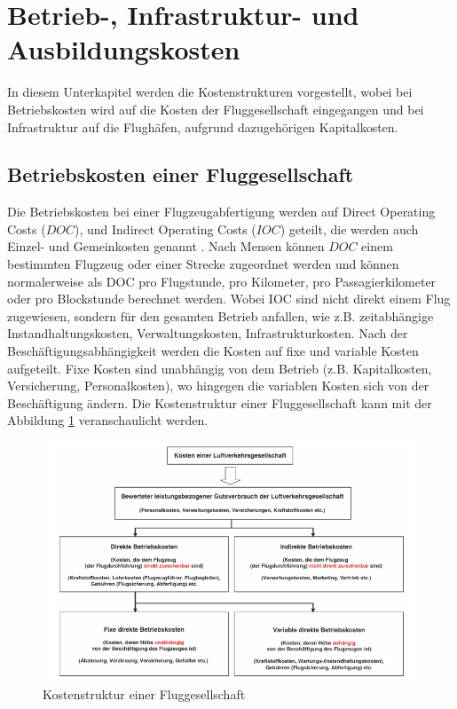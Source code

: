 \section{Betrieb-, Infrastruktur- und Ausbildungskosten}
\label{s:Kosten}
In diesem Unterkapitel werden die Kostenstrukturen vorgestellt, wobei bei Betriebskosten wird auf die Kosten der Fluggesellschaft
eingegangen und bei Infrastruktur auf die Flughäfen, aufgrund dazugehörigen Kapitalkosten.
%
\subsection{Betriebskosten einer Fluggesellschaft}

Die Betriebskosten bei einer Flugzeugabfertigung werden auf Direct Operating Costs ($DOC$), und Indirect Operating Costs 
($IOC$) geteilt, die werden auch Einzel- und Gemeinkosten genannt \cite{conrady2019luftverkehr}. 
Nach Mensen \cite{mensen2013handbuch} können $DOC$ einem bestimmten Flugzeug oder einer Strecke zugeordnet 
werden und können normalerweise als DOC pro Flugstunde, pro Kilometer, pro Passagierkilometer oder pro Blockstunde 
berechnet werden. Wobei IOC sind nicht direkt einem Flug zugewiesen, sondern für den gesamten Betrieb anfallen, wie z.B. zeitabhängige 
Instandhaltungskosten, Verwaltungskosten, Infrastrukturkosten. Nach der Beschäftigungsabhängigkeit werden die Kosten auf fixe und variable Kosten aufgeteilt. 
Fixe Kosten sind unabhängig von dem Betrieb (z.B. Kapitalkosten, Versicherung, Personalkosten), wo hingegen die variablen Kosten sich 
von der Beschäftigung ändern.
%
Die Kostenstruktur einer Fluggesellschaft kann mit der Abbildung \ref{doc} veranschaulicht werden.
%
\begin{figure}[h]
	\centering
	\includegraphics[width=0.9\linewidth]{Bilder/Systematik der DOC_Berechnung.png}
	\caption[Kostenstruktur einer Fluggesellschaft]{Kostenstruktur einer Fluggesellschaft \cite{mensen2013handbuch}}
	\label{doc}
\end{figure}

